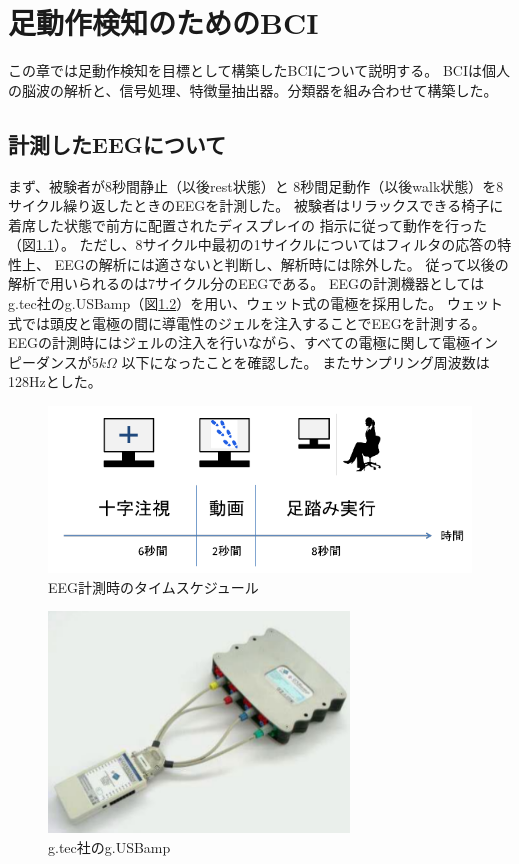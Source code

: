 \chapter{\mc 足動作検知のための\rm BCI}
この章では足動作検知を目標として構築したBCIについて説明する。
BCIは個人の脳波の解析と、信号処理、特徴量抽出器。分類器を組み合わせて構築した。

\section{\mc 計測した\rm EEG\mc について}
まず、被験者が8秒間静止（以後rest状態）と
8秒間足動作（以後walk状態）を8サイクル繰り返したときのEEGを計測した。
被験者はリラックスできる椅子に着席した状態で前方に配置されたディスプレイの
指示に従って動作を行った（図\ref{fig:asibumi}）。
ただし、8サイクル中最初の1サイクルについてはフィルタの応答の特性上、
EEGの解析には適さないと判断し、解析時には除外した。
従って以後の解析で用いられるのは7サイクル分のEEGである。
EEGの計測機器としてはg.tec社のg.USBamp（図\ref{fig:usbamp}）を用い、ウェット式の電極を採用した。
ウェット式では頭皮と電極の間に導電性のジェルを注入することでEEGを計測する。
EEGの計測時にはジェルの注入を行いながら、すべての電極に関して電極インピーダンスが\(5k\Omega\)
以下になったことを確認した。
またサンプリング周波数は128Hzとした。
\begin{figure}
    \centering
    \includegraphics[width=13cm]{images/asibumi.png}
    \caption{EEG計測時のタイムスケジュール}
    \label{fig:asibumi}
\end{figure}
\begin{figure}
    \centering
    \includegraphics[width=8cm]{images/usbamp.png}
    \caption{g.tec社のg.USBamp}
    \label{fig:usbamp}
\end{figure}

